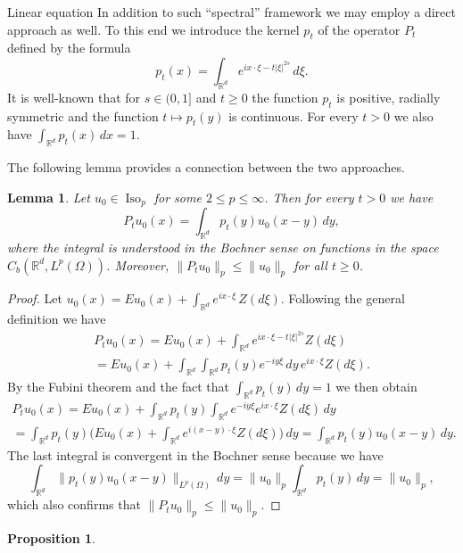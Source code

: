 \documentclass[a4paper,10pt,fleqn]{amsart}
\newtheorem{lemma}[theorem]{Lemma}
\newtheorem{proposition}[theorem]{Proposition}
\theoremstyle{remark}
\theoremstyle{definition}
\DeclareMathOperator{\Iso}{Iso}
\newcommand{\X} {{\mathbb{R}^d}}
\renewcommand{\=} {\overset{d}{=}}
\newcommand{\Lp} {{L^p(\Omega)}}
\begin{document}
\begin{section}{Linear equation}
         In addition to such ``spectral'' framework
         we may employ a direct approach as well.
	To this end we introduce the kernel $p_t$ of the operator $P_t$ defined by the formula
	\begin{equation*}
	 p_t(x) = \int_\X e^{ix\cdot\xi-t|\xi|^{2s}}\,d\xi.
	\end{equation*}
	It is well-known that for $s\in(0,1]$ and $t\geq0$ the function $p_t$ is positive, radially symmetric and the function $t\mapsto p_t(y)$ is continuous. For every $t>0$ we also have $\int_\X p_t(x)\,dx=1$.

	The following lemma provides a connection between the two approaches.
       \begin{lemma}\label{kernel-linfty}
          Let $u_0\in\Iso_p$ for some $2\leq p\leq\infty$. Then for every $t>0$ we have
          \begin{equation*}
           P_tu_0(x) = \int_\X p_t(y)u_0(x-y)\,dy,
          \end{equation*}
          where the integral is understood in the Bochner sense on functions in the space $C_b(\X,\Lp)$. Moreover, $\|P_tu_0\|_p\leq \|u_0\|_p$ for all $t\geq0$.
      \end{lemma}
  \begin{proof}
    Let $u_0(x) = Eu_0(x)+\int_\X e^{ix\cdot\xi}\,Z(d\xi)$. Following the general definition we have
    \begin{multline*}
      P_tu_0(x) = Eu_0(x)+\int_\X e^{ix\cdot\xi-t|\xi|^{2s}}Z(d\xi) \\
      = Eu_0(x)+\int_\X\int_\X p_t(y) e^{-iy\xi}\,dy\, e^{ix\cdot\xi}Z(d\xi).
    \end{multline*}
    By the Fubini theorem and the fact that $\int_\X p_t(y)\,dy = 1$ we then obtain
    \begin{multline*}
      P_tu_0(x) = Eu_0(x)+\int_\X p_t(y) \int_\X e^{-iy\xi}e^{ix\cdot\xi}Z(d\xi)\,dy \\
      = \int_\X p_t(y)\Bigg(Eu_0(x)+\int_\X e^{i(x-y)\cdot\xi}Z(d\xi)\Bigg)\,dy
      = \int_\X p_t(y)u_0(x-y)\,dy.
    \end{multline*}
    The last integral is convergent in the Bochner sense because we have
    \begin{equation}\label{norm-estimate}
     \int_\X \|p_t(y)u_0(x-y)\|_{\Lp}\,dy = \|u_0\|_p\int_\X p_t(y)\,dy = \|u_0\|_p,
    \end{equation}
    which also confirms that $\|P_tu_0\|_p\leq \|u_0\|_p$.
  \end{proof}
  \begin{proposition}\label{iso-infinity}

\end{proposition}
\end{section}
\end{document}
